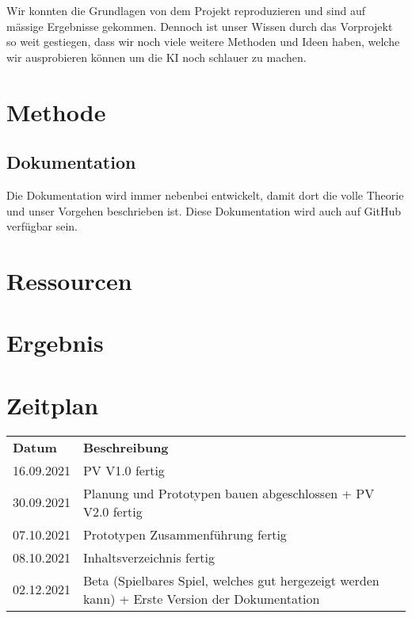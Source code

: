 \documentclass{article}
\begin{document}
Wir konnten die Grundlagen von dem Projekt reproduzieren und sind auf mässige
Ergebnisse gekommen. Dennoch ist unser Wissen durch das Vorprojekt so weit
gestiegen, dass wir noch viele weitere Methoden und Ideen haben, welche wir
ausprobieren können um die KI noch schlauer zu machen.

\section{Methode}
\label{chap:methode}


\subsection{Dokumentation}
\label{chap:m_dokumentation}
Die Dokumentation wird immer nebenbei entwickelt, damit dort die volle Theorie
und unser Vorgehen beschrieben ist. Diese Dokumentation wird auch auf GitHub
verfügbar sein.


\section{Ressourcen}
\label{chap:ressourcen}


\section{Ergebnis}


\section{Zeitplan}
\label{chap:zeitplan}
\begin{table}[H]
    \begin{tabular}{ll}
    \textbf{Datum} & \textbf{Beschreibung}                                                                         \\
    16.09.2021     & PV V1.0 fertig                                                                                \\
    30.09.2021     & Planung und Prototypen bauen abgeschlossen + PV V2.0 fertig                                   \\
    07.10.2021     & Prototypen Zusammenführung fertig                                                             \\
    08.10.2021     & Inhaltsverzeichnis fertig                                                                     \\
    02.12.2021     & Beta (Spielbares Spiel, welches gut hergezeigt werden kann) + Erste Version der Dokumentation
    \end{tabular}
\end{table}
\end{document}
